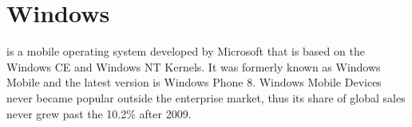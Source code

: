 %
%
%

\section{Windows}
 is a mobile operating system developed by Microsoft that is based on the Windows CE and Windows NT Kernels. It was formerly known as Windows Mobile and the latest version is Windows Phone 8. Windows Mobile Devices never became popular outside the enterprise market, thus its share of global sales never grew past the 10.2\% after 2009. 


